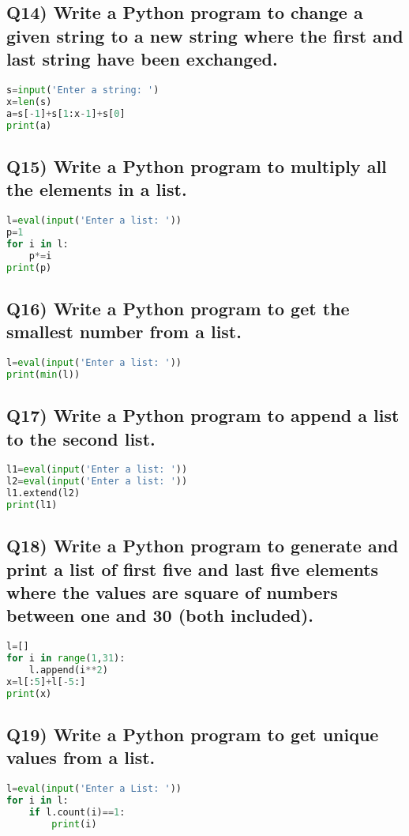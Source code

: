 \documentclass{article}
\begin{document}
\subsection*{Q14) Write a Python program to change a given string to a new string where the first and last string have been exchanged.}
\begin{lstlisting}[language=Python]
s=input('Enter a string: ')
x=len(s)
a=s[-1]+s[1:x-1]+s[0]
print(a)
\end{lstlisting}

\subsection*{Q15) Write a Python program to multiply all the elements in a list.}
\begin{lstlisting}[language=Python]
l=eval(input('Enter a list: '))
p=1
for i in l:
    p*=i
print(p)
\end{lstlisting}

\subsection*{Q16) Write a Python program to get the smallest number from a list.}
\begin{lstlisting}[language=Python]
l=eval(input('Enter a list: '))
print(min(l))
\end{lstlisting}

\subsection*{Q17) Write a Python program to append a list to the second list.}
\begin{lstlisting}[language=Python]
l1=eval(input('Enter a list: '))
l2=eval(input('Enter a list: '))
l1.extend(l2)
print(l1)
\end{lstlisting}

\subsection*{Q18) Write a Python program to generate and print a list of first five and last five elements where the values are square of numbers between one and 30 (both included).}
\begin{lstlisting}[language=Python]
l=[]
for i in range(1,31):
    l.append(i**2)
x=l[:5]+l[-5:]
print(x)
\end{lstlisting}

\subsection*{Q19) Write a Python program to get unique values from a list.}
\begin{lstlisting}[language=Python]
l=eval(input('Enter a List: '))
for i in l:
    if l.count(i)==1:
        print(i)
\end{lstlisting}
\end{document}
